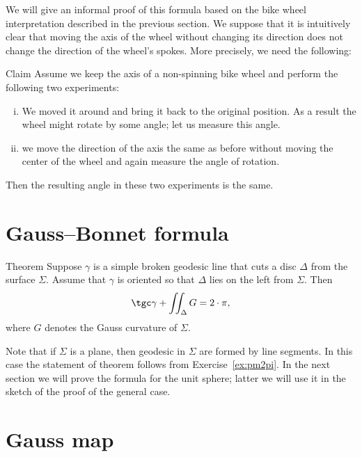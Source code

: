 We will give an informal proof of this formula based on the bike wheel interpretation described in the previous section.
We suppose that it is intuitively clear that moving the axis of the wheel without changing its direction does not change the direction of the wheel's spokes.
More precisely, we need the following:

\begin{thm}{Claim}
Assume we keep the axis of a non-spinning bike wheel and perform the following two experiments:

\begin{enumerate}[(i)]
\item We moved it around and bring it back to the original position. 
As a result the wheel might rotate by some angle; let us measure this angle.

\item we move the direction of the axis the same as before without moving the center of the wheel and again measure the angle of rotation.
\end{enumerate}

Then the resulting angle in these two experiments is the same. 
\end{thm}

\section{Gauss--Bonnet formula}

\begin{thm}{Theorem}
Suppose $\gamma$ is a simple broken geodesic line that cuts a disc $\Delta$ from the surface $\Sigma$.
Assume that $\gamma$ is oriented so that $\Delta$ lies on the left from $\Sigma$.
Then 
\[\tgc\gamma+\iint_\Delta G=2\cdot \pi,\]
where $G$ denotes the Gauss curvature of $\Sigma$.
\end{thm}

Note that if $\Sigma$ is a plane, then geodesic in $\Sigma$ are formed by line segments.
In this case the statement of theorem follows from Exercise~\ref{ex:pm2pi}.
In the next section we will prove the formula for the unit sphere;
latter we will use it in the sketch of the proof of the general case.









\section{Gauss map}

